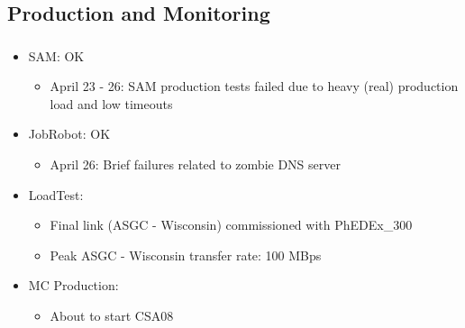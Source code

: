 \documentclass{beamer}
\begin{document}
\subsection{Production and Monitoring}
\begin{frame}
\frametitle{}
\begin{itemize}
    \item SAM: OK
    \begin{itemize}
        \item April 23 - 26: SAM production tests failed due to heavy (real) production load and low timeouts
    \end{itemize}
    \item JobRobot: OK 
    \begin{itemize}
        \item April 26: Brief failures related to zombie DNS server
    \end{itemize}
    \item LoadTest:
    \begin{itemize}
        \item Final link (ASGC - Wisconsin) commissioned with PhEDEx_300
        \item Peak ASGC - Wisconsin transfer rate: 100 MBps
    \end{itemize}
    \item MC Production:
    \begin{itemize}
        \item About to start CSA08
    \end{itemize}
\end{itemize}
\end{frame}
\end{document}
